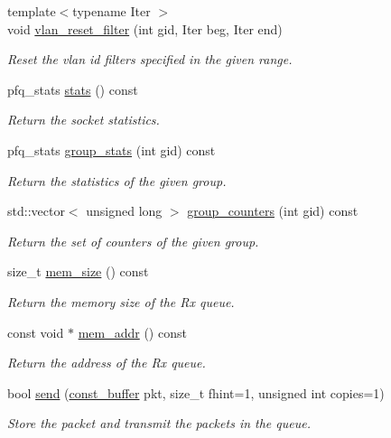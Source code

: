 \begin{DoxyCompactItemize}
{\footnotesize template$<$typename Iter $>$ }\\void \hyperlink{classpfq_1_1socket_a18efa89248a6d6bfb29d575744d21608}{vlan\+\_\+reset\+\_\+filter} (int gid, Iter beg, Iter end)
\begin{DoxyCompactList}\small\item\em Reset the vlan id filters specified in the given range. \end{DoxyCompactList}\item 
pfq\+\_\+stats \hyperlink{classpfq_1_1socket_a00e21405b0711ce7bb7a202f66487cb9}{stats} () const
\begin{DoxyCompactList}\small\item\em Return the socket statistics. \end{DoxyCompactList}\item 
pfq\+\_\+stats \hyperlink{classpfq_1_1socket_aba2cd658b52f9c00b163deb891983709}{group\+\_\+stats} (int gid) const
\begin{DoxyCompactList}\small\item\em Return the statistics of the given group. \end{DoxyCompactList}\item 
std\+::vector$<$ unsigned long $>$ \hyperlink{classpfq_1_1socket_ac1548d51e8727a57fe6e98953769bf80}{group\+\_\+counters} (int gid) const
\begin{DoxyCompactList}\small\item\em Return the set of counters of the given group. \end{DoxyCompactList}\item 
size\+\_\+t \hyperlink{classpfq_1_1socket_af4e748efa70a0b0c80eb5abf6a0d0277}{mem\+\_\+size} () const
\begin{DoxyCompactList}\small\item\em Return the memory size of the Rx queue. \end{DoxyCompactList}\item 
const void $\ast$ \hyperlink{classpfq_1_1socket_aac25000416bf154eb0e3d632e051a202}{mem\+\_\+addr} () const
\begin{DoxyCompactList}\small\item\em Return the address of the Rx queue. \end{DoxyCompactList}\item 
bool \hyperlink{classpfq_1_1socket_a2d80378cecae811bedc0ae8ff9412e62}{send} (\hyperlink{namespacepfq_ac835a1bd09b4cbaba61c100b50d0a99f}{const\+\_\+buffer} pkt, size\+\_\+t fhint=1, unsigned int copies=1)
\begin{DoxyCompactList}\small\item\em Store the packet and transmit the packets in the queue. \end{DoxyCompactList}\item 

\end{DoxyCompactItemize}
